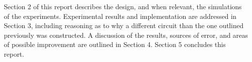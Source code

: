 \noindent Section 2 of this report describes the design, and when relevant, the simulations of the experiments. Experimental results and implementation are addressed in Section 3, including reasoning as to why a different circuit than the one outlined previously was constructed. A discussion of the results, sources of error, and areas of possible improvement are outlined in Section 4. Section 5 concludes this report. \newline


